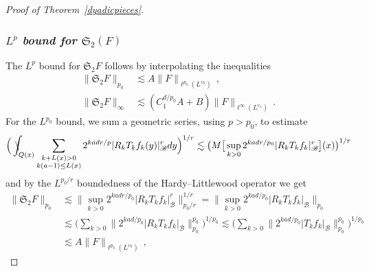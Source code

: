 \documentclass[11pt]{amsart}
\theoremstyle{definition}
\numberwithin{theorem}{section}
\numberwithin{definition}{section}
\renewcommand{\wp}{\upsilon}
\def\intslash{\rlap{\kern  .32em $\mspace {.5mu}\backslash$ }\int}
\newcommand{\Be}{\begin{equation}}
\newcommand{\Ee}{\end{equation}}
\newcommand{\note}[1]{\footnote{\texttt{\Small #1}}}
\def\intslash{\rlap{\kern  .32em $\mspace {.5mu}\backslash$ }\int}
\def\sB{{\mathscr{B}}}
\def\lc{\lesssim}
\def\fS{{\mathfrak {S}}}
\begin{document}
\begin{proof}[Proof of Theorem~\ref{dyadicpieces}]
\subsubsection*{{\it $L^p$ bound for $\fS_2(F)$}}
The $L^p$ bound for $\fS_2F$ follows by interpolating the inequalities
\Be \label{psest}
\begin{aligned}
\|\fS_2F\|_{p_0}&\lc A\|F\|_{\ell^{p_0}(L^{\wp_0})}\,,
\\
\|\fS_2F\|_{\infty}&\lc (C_1^{d/p_0}A+B)\|F\|_{\ell^{\infty}(L^{\wp_1})}\,.
\end{aligned}
\Ee
For the
 $L^{p_0}$ bound, we sum a geometric series, using $p>p_0$, to estimate
$$\Big(\intslash_{Q(x)} \sum_{\substack{k+L(x)> 0\\ k(a-1)\le L(x)}}
2^{kad r/p}|R_kT_k f_k(y)|_\sB^r dy\Big)^{1/r}
\lc \big(M \big[\sup_{k>0} 2^{kad r/p_0}|R_kT_k f_k|_\sB^r\big](x)\big)^{1/r}$$
and by the $L^{p_0/r}$ boundedness of the Hardy--Littlewood operator we get
\begin{align*}\|\fS_2 F\|_{p_0} &\lc \big\|\sup_{k>0}
2^{kad r/p_0}|R_kT_k f_k|_\sB^r\big\|_{p_0/r}^{1/r}=
\big\|\sup_{k>0}
2^{kad /p_0}|R_kT_k f_k|_\sB\big\|_{p_0}
\\&\lc
\Big(\sum_{k>0} \big\|2^{kad /p_0}|R_kT_k f_k|_\sB\big\|_{p_0}^{p_0}\Big)^{1/p_0}
\lc
\Big(\sum_{k>0} \big\|2^{kad /p_0}|T_k f_k|_\sB\big\|_{p_0}^{p_0}\Big)^{1/p_0}
\\&\lc A
\|F\|_{\ell^{p_0}(L^{\wp_0})}\,,
\end{align*}





\end{proof}
\end{document}
